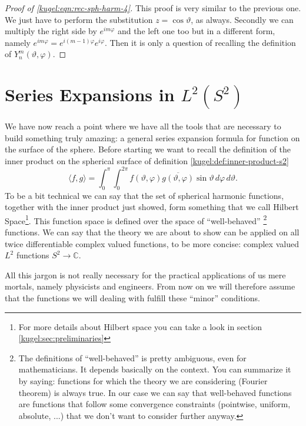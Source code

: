 \begin{proof}[Proof of \eqref{kugel:eqn:rec-sph-harm-4}]
  This proof is very similar to the previous one. We just have to perform the
  substitution $z = \cos \vartheta$, as always. Secondly we can multiply the
  right side by $e^{im\varphi}$ and the left one too but in a different form,
  namely $e^{im\varphi}=e^{i(m-1)\varphi}e^{i\varphi}$. Then it is only a
  question of recalling the definition of $Y^m_n(\vartheta, \varphi)$.
\end{proof}

\section{Series Expansions in $L^2(S^2)$}

We have now reach a point where we have all the tools that are necessary to
build something truly amazing: a general series expansion formula for function
on the surface of the sphere.  Before starting we want to recall the definition
of the inner product on the spherical surface of definition
\ref{kugel:def:inner-product-s2}
\begin{equation*}
  \langle f, g \rangle
  = \int_{0}^\pi \int_0^{2\pi}
    f(\vartheta, \varphi) \overline{g(\vartheta, \varphi)}
    \sin \vartheta \, d\varphi \, d\vartheta.
\end{equation*}
To be a bit technical we can say that the set of spherical harmonic functions,
together with the inner product just showed, form something that we call Hilbert
Space\footnote{For more details about Hilbert space you can take a look in
section \ref{kugel:sec:preliminaries}}.  This function space is defined over the
space of ``well-behaved'' \footnote{The definitions of ``well-behaved'' is
pretty ambiguous, even for mathematicians.  It depends basically on the context.
You can summarize it by saying: functions for which the theory we are considering
(Fourier theorem) is always true. In our case we can say that well-behaved
functions are functions that follow some convergence constraints (pointwise,
uniform, absolute, ...) that we don't want to consider further anyway.}
functions.  We can say that the theory we are about to show can be applied on
all twice differentiable complex valued functions, to be more concise: complex
valued $L^2$ functions $S^2 \to \mathbb{C}$.

All this jargon is not really necessary for the practical applications of us
mere mortals, namely physicists and engineers.  From now on we will therefore
assume that the functions we will dealing with fulfill these ``minor''
conditions.

